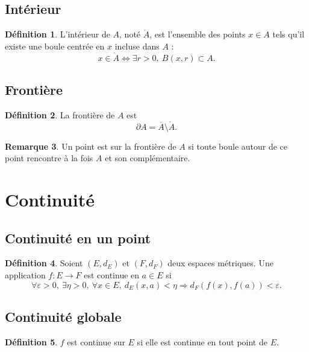 \documentclass[11pt,a4paper]{article}
\theoremstyle{definition}
\newtheorem{definition}{Définition}[section]
\newtheorem{remarque}[definition]{Remarque}
\theoremstyle{plain}
\newcommand{\eps}{\varepsilon}
\begin{document}
\subsection{Intérieur}

\begin{definition}
L'intérieur de $A$, noté $\mathring A$, est l'ensemble des points $x\in A$ tels qu'il existe une boule centrée en $x$ incluse dans $A$ :
\[
x\in\mathring A
\Longleftrightarrow
\exists r>0,\ B(x,r)\subset A.
\]
\end{definition}

\subsection{Frontière}

\begin{definition}
La frontière de $A$ est
\[
\partial A=\overline A\setminus \mathring A.
\]
\end{definition}

\begin{remarque}
Un point est sur la frontière de $A$ si toute boule autour de ce point rencontre à la fois $A$ et son complémentaire.
\end{remarque}

\section{Continuité}

\subsection{Continuité en un point}

\begin{definition}
Soient $(E,d_E)$ et $(F,d_F)$ deux espaces métriques.
Une application $f:E\to F$ est continue en $a\in E$ si
\[
\forall \eps>0,\ \exists \eta>0,\ \forall x\in E,\ d_E(x,a)<\eta
\Rightarrow
d_F(f(x),f(a))<\eps.
\]
\end{definition}

\subsection{Continuité globale}

\begin{definition}
$f$ est continue sur $E$ si elle est continue en tout point de $E$.
\end{definition}
\end{document}
